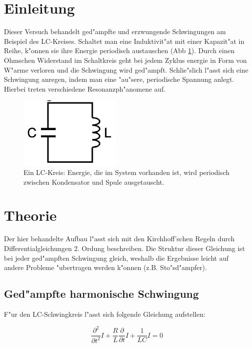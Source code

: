 \section{Einleitung}
	\label{sec:einleitung}
	Dieser Versuch behandelt ged"ampfte und erzwungende Schwingungen am Beispiel des LC-Kreises.
	Schaltet man eine Induktivit"at mit einer Kapazit"at in Reihe, k"onnen sie ihre Energie periodisch austauschen (Abb \ref{fig:lc-kreis}).
	Durch einen Ohmschen Widerstand im Schaltkreis geht bei jedem Zyklus energie in Form von W"arme verloren und die Schwingung wird ged"ampft.
	Schlie"slich l"asst sich eine Schwingung anregen, indem man eine "au"sere, periodische Spannung anlegt.
	Hierbei treten verschiedene Resonanzph"anomene auf.
	
	\begin{figure}[h!]
		\centering
		\includegraphics[width = 5cm]{img/lc-kreis.JPG}
		\caption{Ein LC-Kreis: Energie, die im System vorhanden ist, wird periodisch zwischen Kondensator und Spule ausgetauscht. \cite{anleitung}}
		\label{fig:lc-kreis}
	\end{figure}

\section{Theorie}
	\label{sec:theorie}

	Der hier behandelte Aufbau l"asst sich mit den Kirchhoff'schen Regeln durch Differentialgleichungen 2. Ordung beschreiben.
	Die Struktur dieser Gleichung ist bei jeder ged"ampften Schwingung gleich, weshalb die Ergebnisse leicht auf andere Probleme "ubertragen werden k"onnen (z.B. Sto"sd"ampfer).

	\subsection{Ged"ampfte harmonische Schwingung}

	F"ur den LC-Schwingkreis l"asst sich folgende Gleichung aufstellen:

	\begin{equation*}
		\frac{\partial^2}{\partial t^2} I + \frac{R}{L} \frac{\partial}{\partial t} I + \frac{1}{LC} I = 0
	\end{equation*}


